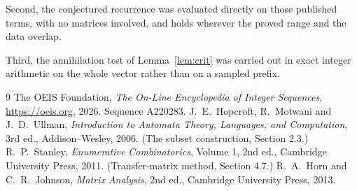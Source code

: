 \documentclass[11pt,a4paper]{article}
\theoremstyle{plain}
\theoremstyle{definition}
\begin{document}
Second, the conjectured recurrence was evaluated directly on those published terms, with no
matrices involved, and holds wherever the proved range and the data overlap.

Third, the annihilation test of Lemma~\ref{lem:crit} was carried out in exact integer
arithmetic on the whole vector rather than on a sampled prefix.

\begin{thebibliography}{9}
 The OEIS Foundation, \emph{The On-Line Encyclopedia of Integer
Sequences}, \url{https://oeis.org}, 2026. Sequence A220283.
 J.~E.~Hopcroft, R.~Motwani and J.~D.~Ullman, \emph{Introduction to Automata
Theory, Languages, and Computation}, 3rd ed., Addison--Wesley, 2006. (The subset
construction, Section 2.3.)
 R.~P.~Stanley, \emph{Enumerative Combinatorics}, Volume 1, 2nd ed.,
Cambridge University Press, 2011. (Transfer-matrix method, Section 4.7.)
 R.~A.~Horn and C.~R.~Johnson, \emph{Matrix Analysis}, 2nd ed., Cambridge
University Press, 2013.
\end{thebibliography}
\end{document}
